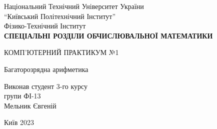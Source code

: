 \begin{titlepage}
    \begin{center}
        \vspace*{1cm}
\Large
            Національний Технічний Університет України\\
“Київський Політехнічний Інститут”\\
Фізико-Технічний Інститут\\
  \vspace{1.5cm}
        \huge
        \textbf{СПЕЦІАЛЬНІ РОЗДІЛИ ОБЧИСЛЮВАЛЬНОЇ МАТЕМАТИКИ}
            
        \vspace{0.5cm}
        \LARGE
        КОМП’ЮТЕРНИЙ ПРАКТИКУМ №1

        Багаторозрядна арифметика
            
        \vspace{1.5cm}
            

        \vfill
            
	\end{center}
            	
	\begin{flushright}
        \Large
        	Виконав студент 3-го курсу\\
	групи ФІ-13\\
	Мельник Євгеній\\
    	\end{flushright} 
 \vspace{2.5cm}
\centering \Large Київ 2023
\end{titlepage}